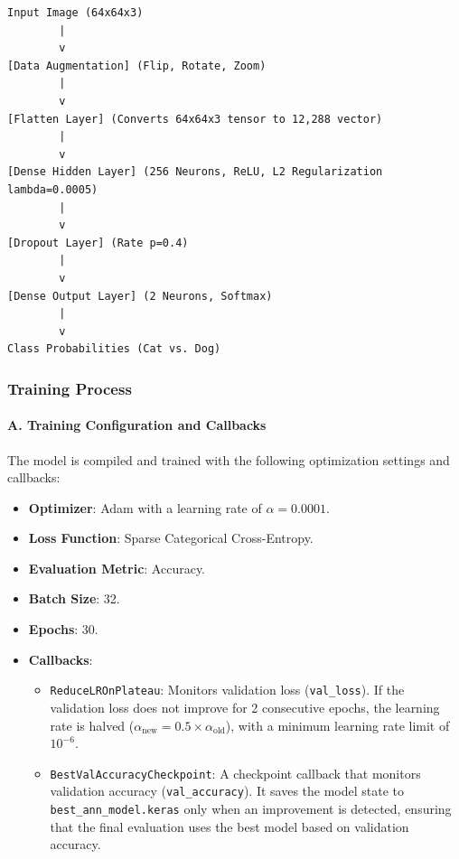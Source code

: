 \documentclass[12pt,a4paper]{article}
\begin{document}
\begin{verbatim}
Input Image (64x64x3)
        |
        v
[Data Augmentation] (Flip, Rotate, Zoom)
        |
        v
[Flatten Layer] (Converts 64x64x3 tensor to 12,288 vector)
        |
        v
[Dense Hidden Layer] (256 Neurons, ReLU, L2 Regularization lambda=0.0005)
        |
        v
[Dropout Layer] (Rate p=0.4)
        |
        v
[Dense Output Layer] (2 Neurons, Softmax)
        |
        v
Class Probabilities (Cat vs. Dog)
\end{verbatim}

\subsubsection{Training Process}

\paragraph{A. Training Configuration and Callbacks}
The model is compiled and trained with the following optimization settings and callbacks:
\begin{itemize}
    \item \textbf{Optimizer}: Adam with a learning rate of $\alpha = 0.0001$.
    \item \textbf{Loss Function}: Sparse Categorical Cross-Entropy.
    \item \textbf{Evaluation Metric}: Accuracy.
    \item \textbf{Batch Size}: 32.
    \item \textbf{Epochs}: 30.
    \item \textbf{Callbacks}:
    \begin{itemize}
        \item \texttt{ReduceLROnPlateau}: Monitors validation loss (\texttt{val\_loss}). If the validation loss does not improve for 2 consecutive epochs, the learning rate is halved ($\alpha_{\text{new}} = 0.5 \times \alpha_{\text{old}}$), with a minimum learning rate limit of $10^{-6}$.
        \item \texttt{BestValAccuracyCheckpoint}: A checkpoint callback that monitors validation accuracy (\texttt{val\_accuracy}). It saves the model state to \texttt{best\_ann\_model.keras} only when an improvement is detected, ensuring that the final evaluation uses the best model based on validation accuracy.
    \end{itemize}
\end{itemize}
\end{document}
